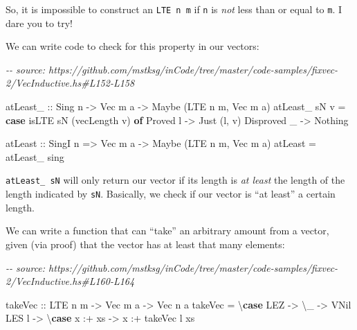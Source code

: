 \documentclass[]{article}
\newenvironment{Shaded}{}{}
\newcommand{\CommentTok}[1]{\textcolor[rgb]{0.38,0.63,0.69}{\textit{#1}}}
\newcommand{\DataTypeTok}[1]{\textcolor[rgb]{0.56,0.13,0.00}{#1}}
\newcommand{\KeywordTok}[1]{\textcolor[rgb]{0.00,0.44,0.13}{\textbf{#1}}}
\newcommand{\NormalTok}[1]{#1}
\newcommand{\OperatorTok}[1]{\textcolor[rgb]{0.40,0.40,0.40}{#1}}
\newcommand{\OtherTok}[1]{\textcolor[rgb]{0.00,0.44,0.13}{#1}}
\begin{document}
So, it is impossible to construct an \texttt{LTE\ n\ m} if \texttt{n} is
\emph{not} less than or equal to \texttt{m}. I dare you to try!

We can write code to check for this property in our vectors:

\begin{Shaded}
\begin{Highlighting}[]
\CommentTok{{-}{-} source: https://github.com/mstksg/inCode/tree/master/code{-}samples/fixvec{-}2/VecInductive.hs\#L152{-}L158}

\OtherTok{atLeast\_ ::} \DataTypeTok{Sing}\NormalTok{ n }\OtherTok{{-}>} \DataTypeTok{Vec}\NormalTok{ m a }\OtherTok{{-}>} \DataTypeTok{Maybe}\NormalTok{ (}\DataTypeTok{LTE}\NormalTok{ n m, }\DataTypeTok{Vec}\NormalTok{ m a)}
\NormalTok{atLeast\_ sN v }\OtherTok{=} \KeywordTok{case}\NormalTok{ isLTE sN (vecLength v) }\KeywordTok{of}
    \DataTypeTok{Proved}\NormalTok{ l    }\OtherTok{{-}>} \DataTypeTok{Just}\NormalTok{ (l, v)}
    \DataTypeTok{Disproved}\NormalTok{ \_ }\OtherTok{{-}>} \DataTypeTok{Nothing}

\OtherTok{atLeast ::} \DataTypeTok{SingI}\NormalTok{ n }\OtherTok{=>} \DataTypeTok{Vec}\NormalTok{ m a }\OtherTok{{-}>} \DataTypeTok{Maybe}\NormalTok{ (}\DataTypeTok{LTE}\NormalTok{ n m, }\DataTypeTok{Vec}\NormalTok{ m a)}
\NormalTok{atLeast }\OtherTok{=}\NormalTok{ atLeast\_ sing}
\end{Highlighting}
\end{Shaded}

\texttt{atLeast\_\ sN} will only return our vector if its length is \emph{at
least} the length of the length indicated by \texttt{sN}. Basically, we check if
our vector is ``at least'' a certain length.

We can write a function that can ``take'' an arbitrary amount from a vector,
given (via proof) that the vector has at least that many elements:

\begin{Shaded}
\begin{Highlighting}[]
\CommentTok{{-}{-} source: https://github.com/mstksg/inCode/tree/master/code{-}samples/fixvec{-}2/VecInductive.hs\#L160{-}L164}

\OtherTok{takeVec ::} \DataTypeTok{LTE}\NormalTok{ n m }\OtherTok{{-}>} \DataTypeTok{Vec}\NormalTok{ m a }\OtherTok{{-}>} \DataTypeTok{Vec}\NormalTok{ n a}
\NormalTok{takeVec }\OtherTok{=}\NormalTok{ \textbackslash{}}\KeywordTok{case}
    \DataTypeTok{LEZ}   \OtherTok{{-}>}\NormalTok{ \textbackslash{}\_ }\OtherTok{{-}>} \DataTypeTok{VNil}
    \DataTypeTok{LES}\NormalTok{ l }\OtherTok{{-}>}\NormalTok{ \textbackslash{}}\KeywordTok{case}
\NormalTok{      x }\OperatorTok{:+}\NormalTok{ xs }\OtherTok{{-}>}\NormalTok{ x }\OperatorTok{:+}\NormalTok{ takeVec l xs}
\end{Highlighting}
\end{Shaded}
\end{document}

